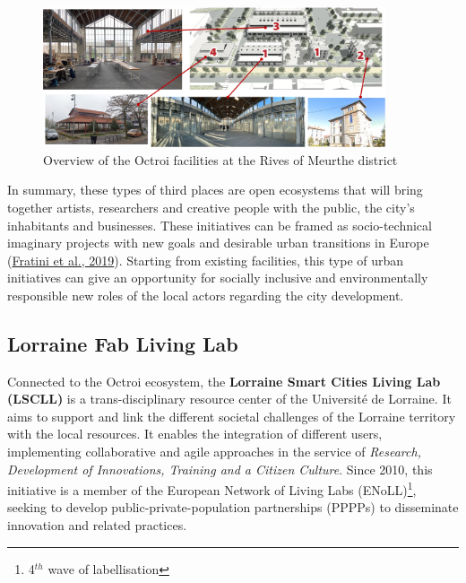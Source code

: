 \documentclass[
  11pt,
]{article}
\begin{document}
\begin{figure}[H]

{\centering \includegraphics[width=0.9\textwidth,height=\textheight]{figures/ok3/OK3-01.jpg}

}

\caption{\label{fig-ok1}Overview of the Octroi facilities at the Rives
of Meurthe district}

\end{figure}

In summary, these types of third places are open ecosystems that will
bring together artists, researchers and creative people with the public,
the city's inhabitants and businesses. These initiatives can be framed
as socio-technical imaginary projects with new goals and desirable urban
transitions in Europe (\protect\hyperlink{ref-Fratini2019}{Fratini et
al., 2019}). Starting from existing facilities, this type of urban
initiatives can give an opportunity for socially inclusive and
environmentally responsible new roles of the local actors regarding the
city development.

\hypertarget{lorraine-fab-living-lab}{%
\subsection{\texorpdfstring{Lorraine Fab Living
Lab\textregistered}{Lorraine Fab Living Lab}}\label{lorraine-fab-living-lab}}

Connected to the Octroi ecosystem, the \textbf{Lorraine Smart Cities
Living Lab (LSCLL)} is a trans-disciplinary resource center of the
Université de Lorraine. It aims to support and link the different
societal challenges of the Lorraine territory with the local resources.
It enables the integration of different users, implementing
collaborative and agile approaches in the service of \emph{Research,
Development of Innovations, Training and a Citizen Culture}. Since 2010,
this initiative is a member of the European Network of Living Labs
(ENoLL)\footnote{4\(^{th}\) wave of labellisation}, seeking to develop
public-private-population partnerships (PPPPs) to disseminate innovation
and related practices.
\end{document}

